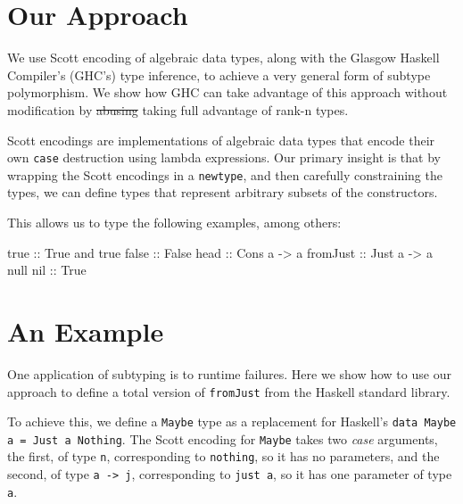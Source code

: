 \documentclass[]{article}
\newenvironment{Shaded}{}{}
\newcommand{\DataTypeTok}[1]{\textcolor[rgb]{0.56,0.13,0.00}{{#1}}}
\newcommand{\OtherTok}[1]{\textcolor[rgb]{0.00,0.44,0.13}{{#1}}}
\newcommand{\NormalTok}[1]{{#1}}
\begin{document}
\section{Our Approach}\label{our-approach}

We use Scott encoding of algebraic data types, along with the Glasgow
Haskell Compiler's (GHC's) type inference, to achieve a very general
form of subtype polymorphism. We show how GHC can take advantage of this
approach without modification by \sout{abusing} taking full advantage of
rank-n types.

Scott encodings are implementations of algebraic data types that encode
their own \texttt{case} destruction using lambda expressions. Our
primary insight is that by wrapping the Scott encodings in a
\texttt{newtype}, and then carefully constraining the types, we can
define types that represent arbitrary subsets of the constructors.

This allows us to type the following examples, among others:

\begin{Shaded}
\begin{Highlighting}[]
\OtherTok{   true ::} \DataTypeTok{True}
   \NormalTok{and true}\OtherTok{ false ::} \DataTypeTok{False}
\OtherTok{   head ::} \DataTypeTok{Cons} \NormalTok{a }\OtherTok{->} \NormalTok{a}
\OtherTok{   fromJust ::} \DataTypeTok{Just} \NormalTok{a }\OtherTok{->} \NormalTok{a}
   \NormalTok{null}\OtherTok{ nil ::} \DataTypeTok{True}
\end{Highlighting}
\end{Shaded}

\section{An Example}\label{an-example}

One application of subtyping is to runtime failures. Here we show how to
use our approach to define a total version of \texttt{fromJust} from the
Haskell standard library.

To achieve this, we define a \texttt{Maybe} type as a replacement for
Haskell's \texttt{data Maybe a = Just a \textbar{} Nothing}. The Scott
encoding for \texttt{Maybe} takes two \emph{case} arguments, the first,
of type \texttt{n}, corresponding to \texttt{nothing}, so it has no
parameters, and the second, of type \texttt{a -\textgreater{} j},
corresponding to \texttt{just a}, so it has one parameter of type
\texttt{a}.
\end{document}
